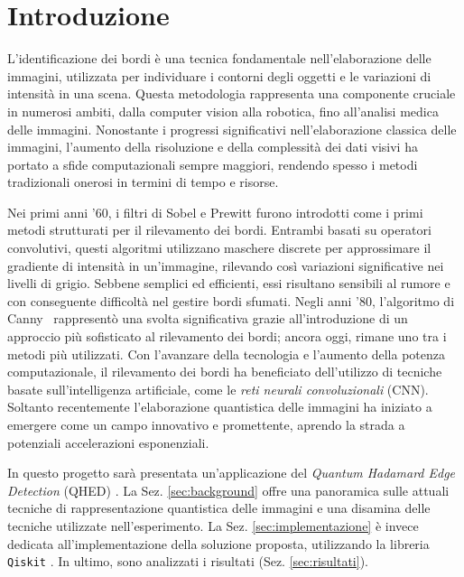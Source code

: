\section{Introduzione}

L'identificazione dei bordi è una tecnica fondamentale nell'elaborazione delle
immagini, utilizzata per individuare i contorni degli oggetti e le variazioni di
intensità in una scena. Questa metodologia rappresenta una componente cruciale
in numerosi ambiti, dalla computer vision alla robotica, fino all'analisi medica
delle immagini. Nonostante i progressi significativi nell'elaborazione classica
delle immagini, l'aumento della risoluzione e della complessità dei dati visivi
ha portato a sfide computazionali sempre maggiori, rendendo spesso i metodi
tradizionali onerosi in termini di tempo e risorse.

Nei primi anni '60, i filtri di Sobel \cite{SobelFeldman1968IsotropicGradient} e
Prewitt furono introdotti come i primi metodi strutturati per il rilevamento dei
bordi. Entrambi basati su operatori convolutivi, questi algoritmi utilizzano
maschere discrete per approssimare il gradiente di intensità in un'immagine,
rilevando così variazioni significative nei livelli di grigio. Sebbene semplici
ed efficienti, essi risultano sensibili al rumore e con conseguente difficoltà
nel gestire bordi sfumati. Negli anni '80, l'algoritmo di
Canny~\cite{CannyPaper} rappresentò una svolta significativa grazie
all'introduzione di un approccio più sofisticato al rilevamento dei bordi;
ancora oggi, rimane uno tra i metodi più utilizzati. Con l'avanzare della
tecnologia e l'aumento della potenza computazionale, il rilevamento dei bordi ha
beneficiato dell'utilizzo di tecniche basate sull'intelligenza artificiale, come
le \emph{reti neurali convoluzionali} (CNN). Soltanto recentemente
l'elaborazione quantistica delle immagini ha iniziato a emergere come un campo
innovativo e promettente, aprendo la strada a potenziali accelerazioni
esponenziali.

In questo progetto sarà presentata un'applicazione del \emph{Quantum Hadamard
Edge Detection} (QHED) \cite{Yao_2017}. La Sez. \ref{sec:background}
offre una panoramica sulle attuali tecniche di
rappresentazione quantistica delle immagini e una disamina delle tecniche
utilizzate nell'esperimento. La Sez. \ref{sec:implementazione}
è invece dedicata all'implementazione della soluzione proposta,
utilizzando la libreria \texttt{Qiskit} \cite{Qiskit}. In ultimo, sono
analizzati i risultati (Sez. \ref{sec:risultati}).
